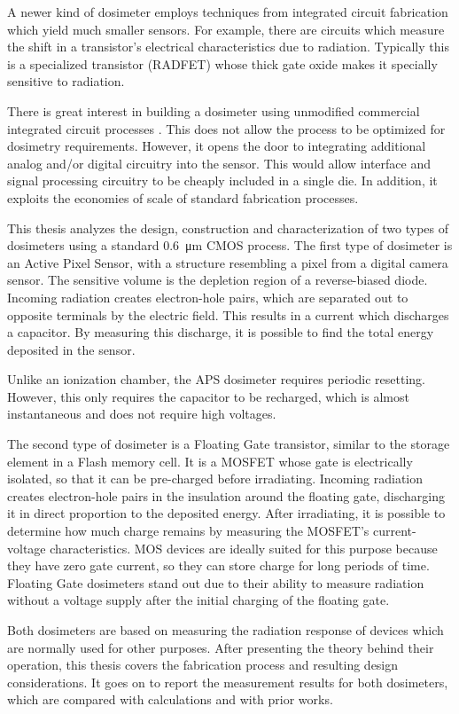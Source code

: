 A newer kind of dosimeter employs techniques from integrated circuit fabrication
which yield much smaller sensors\cite{holmes-siedle_radfet:_1986}.
For example, there are circuits which measure 
the shift in a transistor's electrical characteristics
due to radiation.
Typically this is a specialized transistor (RADFET)
whose thick gate oxide makes it specially sensitive to radiation.

There is great interest in building a dosimeter using 
unmodified commercial integrated circuit processes\cite{lipovetzky_field_2013}
\cite{wang_temperature_2005}
\cite{garcia-moreno_floating_2012}
\cite{dulinski_cmos_2004}.
This does not allow the process to be optimized for dosimetry requirements.
However, it opens the door to integrating additional analog and/or digital
circuitry into the sensor.
This would allow interface and signal processing circuitry to be cheaply included in a single die.
In addition, it exploits the economies of scale of standard fabrication processes.

This thesis analyzes the design, construction and characterization
of two types of dosimeters using a standard \SI{0.6}{\micro\meter} CMOS process.
The first type of dosimeter is an Active Pixel Sensor,
with a structure resembling a pixel from a digital camera sensor.
The sensitive volume is the depletion region of a reverse-biased diode.
Incoming radiation creates electron-hole pairs,
which are separated out to opposite terminals by the electric field.
This results in a current which discharges a capacitor.
By measuring this discharge, it is possible to find the total energy deposited in the sensor.

Unlike an ionization chamber,
the APS dosimeter requires periodic resetting.
However, this only requires the capacitor to be recharged,
which is almost instantaneous and does not require high voltages.

The second type of dosimeter is a Floating Gate transistor,
similar to the storage element in a Flash memory cell.
It is a MOSFET whose gate is electrically isolated,
so that it can be pre-charged before irradiating.
Incoming radiation creates electron-hole pairs in the insulation around the floating gate,
discharging it in direct proportion to the deposited energy.
After irradiating, it is possible to determine how much charge remains
by measuring the MOSFET's current-voltage characteristics.
MOS devices are ideally suited for this purpose because they have zero gate current,
so they can store charge for long periods of time.
Floating Gate dosimeters stand out due to their ability to measure radiation without
a voltage supply after the initial charging of the floating gate.

Both dosimeters are based on measuring the radiation response of devices which are normally used for other purposes.
After presenting the theory behind their operation,
this thesis covers the fabrication process and resulting design considerations.
It goes on to report the measurement results for both dosimeters,
which are compared with calculations and with prior works.
